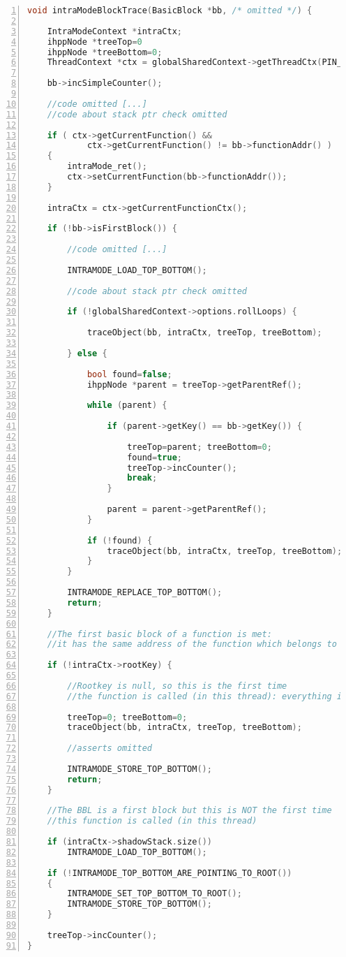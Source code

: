 \documentclass[a4paper,10pt]{report}
\begin{document}
\begin{lstlisting}[language=C++,
	caption={partial implementation of \texttt{intraModeBlockTrace()}},
	label=intraTrace, frame=leftline, numbers=left, showstringspaces=false]
void intraModeBlockTrace(BasicBlock *bb, /* omitted */) {

	IntraModeContext *intraCtx;
	ihppNode *treeTop=0
	ihppNode *treeBottom=0;
	ThreadContext *ctx = globalSharedContext->getThreadCtx(PIN_ThreadUid());

	bb->incSimpleCounter();

	//code omitted [...]
	//code about stack ptr check omitted

	if ( ctx->getCurrentFunction() &&
			ctx->getCurrentFunction() != bb->functionAddr() )
	{
		intraMode_ret();
		ctx->setCurrentFunction(bb->functionAddr());
	}

	intraCtx = ctx->getCurrentFunctionCtx();

	if (!bb->isFirstBlock()) {

		//code omitted [...]

		INTRAMODE_LOAD_TOP_BOTTOM();

		//code about stack ptr check omitted

		if (!globalSharedContext->options.rollLoops) {

			traceObject(bb, intraCtx, treeTop, treeBottom);

		} else {

			bool found=false;
			ihppNode *parent = treeTop->getParentRef();

			while (parent) {

				if (parent->getKey() == bb->getKey()) {

					treeTop=parent; treeBottom=0;
					found=true;
					treeTop->incCounter();
					break;
				}

				parent = parent->getParentRef();
			}

			if (!found) {
				traceObject(bb, intraCtx, treeTop, treeBottom);
			}
		}

		INTRAMODE_REPLACE_TOP_BOTTOM();
		return;
	}

	//The first basic block of a function is met:
	//it has the same address of the function which belongs to

	if (!intraCtx->rootKey) {

		//Rootkey is null, so this is the first time
		//the function is called (in this thread): everything is very simple.

		treeTop=0; treeBottom=0;
		traceObject(bb, intraCtx, treeTop, treeBottom);

		//asserts omitted

		INTRAMODE_STORE_TOP_BOTTOM();
		return;
	}

	//The BBL is a first block but this is NOT the first time
	//this function is called (in this thread)

	if (intraCtx->shadowStack.size())
		INTRAMODE_LOAD_TOP_BOTTOM();

	if (!INTRAMODE_TOP_BOTTOM_ARE_POINTING_TO_ROOT())
	{
		INTRAMODE_SET_TOP_BOTTOM_TO_ROOT();
		INTRAMODE_STORE_TOP_BOTTOM();
	}

	treeTop->incCounter();
}

\end{lstlisting}
\end{document}
